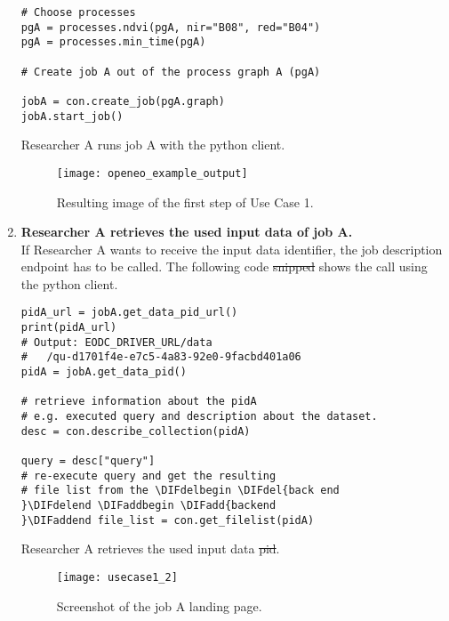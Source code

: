 \documentclass[draft,final]{vutinfth} %
\newenvironment{code}{\captionsetup{type=listing}}{}
\providecommand{\DIFaddtex}[1]{{\protect\color{blue}\uwave{#1}}} %
\providecommand{\DIFdeltex}[1]{{\protect\color{red}\sout{#1}}}                      %
\providecommand{\DIFaddbegin}{} %
\providecommand{\DIFaddend}{} %
\providecommand{\DIFdelbegin}{} %
\providecommand{\DIFdelend}{} %
\providecommand{\DIFadd}[1]{\texorpdfstring{\DIFaddtex{#1}}{#1}} %
\providecommand{\DIFdel}[1]{\texorpdfstring{\DIFdeltex{#1}}{}} %
\begin{document}
\begin{enumerate}
\begin{code}
\begin{verbatim}
# Choose processes
pgA = processes.ndvi(pgA, nir="B08", red="B04")
pgA = processes.min_time(pgA)

# Create job A out of the process graph A (pgA)

jobA = con.create_job(pgA.graph)
jobA.start_job()
	\end{verbatim}
	\caption{Researcher A runs job A with the python client.}
	\label{lst:impl_usecase1_1}
\end{code}	

\begin{figure}[h]
	\centering
	\texttt{[image: openeo\_example\_output]}
	\caption{Resulting image of the first step of Use Case 1.}
	\label{fig:impl_usecase1_min} %
\end{figure}

	\item \textbf{Researcher A retrieves the used input data of job A.} \\
	If Researcher A wants to receive the input data identifier, the job description endpoint has to be called. The following code \DIFdelbegin \DIFdel{snipped }\DIFdelend \DIFaddbegin \DIFadd{snippet }\DIFaddend shows the call using the python client.

\begin{code}
	\begin{verbatim}
pidA_url = jobA.get_data_pid_url()
print(pidA_url)
# Output: EODC_DRIVER_URL/data
#	/qu-d1701f4e-e7c5-4a83-92e0-9facbd401a06
pidA = jobA.get_data_pid()

# retrieve information about the pidA 
# e.g. executed query and description about the dataset.
desc = con.describe_collection(pidA)

query = desc["query"]
# re-execute query and get the resulting 
# file list from the \DIFdelbegin \DIFdel{back end
}\DIFdelend \DIFaddbegin \DIFadd{backend
}\DIFaddend file_list = con.get_filelist(pidA)
	\end{verbatim}
	\caption{Researcher A retrieves the used input data \DIFdelbegin \DIFdel{pid}\DIFdelend \DIFaddbegin \DIFadd{PID}\DIFaddend .}
	\label{lst:impl_usecase1_2}
\end{code}

	\begin{figure}[h]
		\centering
		\texttt{[image: usecase1\_2]}
		\caption{Screenshot of the job A landing page.}
		\label{fig:usecase1-pid} %
	\end{figure}


\end{enumerate}
\end{document}
